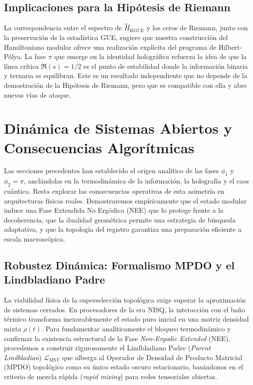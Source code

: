 \documentclass[12pt,a4paper]{article}
\theoremstyle{plain}
\theoremstyle{definition}
\theoremstyle{remark}
\begin{document}
\subsection{Implicaciones para la Hipótesis de Riemann}

La correspondencia entre el espectro de $\hat{H}_{\text{RGUE}}$ y los ceros de Riemann, junto con la preservación de la estadística GUE, sugiere que nuestra construcción del Hamiltoniano modular ofrece una realización explícita del programa de Hilbert-Pólya. La fase $\pi$ que emerge en la identidad holográfica refuerza la idea de que la línea crítica $\Re(s)=1/2$ es el punto de estabilidad donde la información binaria y ternaria se equilibran. Este es un resultado independiente que no depende de la demostración de la Hipótesis de Riemann, pero que es compatible con ella y abre nuevas vías de ataque.

\section{Dinámica de Sistemas Abiertos y Consecuencias Algorítmicas}
\label{sec:consecuencias}

Las secciones precedentes han establecido el origen analítico de las fases $\phi_1$ y $\phi_2 = \pi$, anclándolas en la termodinámica de la información, la holografía y el caos cuántico. Resta explorar las consecuencias operativas de esta asimetría en arquitecturas físicas reales. Demostraremos empíricamente que el estado modular induce una Fase Extendida No Ergódica (NEE) que lo protege frente a la decoherencia, que la dualidad geométrica permite una estrategia de búsqueda adaptativa, y que la topología del registro garantiza una preparación eficiente a escala macroscópica.

\subsection{Robustez Dinámica: Formalismo MPDO y el Lindbladiano Padre}
\label{subsec:robustez_dinamica}

La viabilidad física de la superselección topológica exige superar la aproximación de sistemas cerrados. En procesadores de la era NISQ, la interacción con el baño térmico transforma inexorablemente el estado puro inicial en una matriz densidad mixta $\rho(t)$. Para fundamentar analíticamente el bloqueo termodinámico y confirmar la existencia estructural de la Fase \textit{Non-Ergodic Extended} (NEE), procedemos a construir rigurosamente el Lindbladiano Padre (\textit{Parent Lindbladian}) $\mathcal{L}_{\text{MST}}$ que alberga al Operador de Densidad de Producto Matricial (MPDO) topológico como su único estado oscuro estacionario, basándonos en el criterio de mezcla rápida (\textit{rapid mixing}) para redes tensoriales abiertas.
\end{document}
